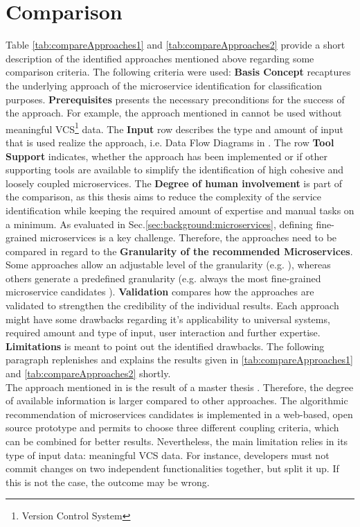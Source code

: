 \section{Comparison} 
\label{sec:stateOfTheArt:comparison}

Table \ref{tab:compareApproaches1} and \ref{tab:compareApproaches2} provide a short description of the identified approaches mentioned above regarding some comparison criteria. The following criteria were used: \textbf{Basis Concept} recaptures the underlying approach of the microservice identification for classification purposes. \textbf{Prerequisites} presents the necessary preconditions for the success of the approach. For example, the approach mentioned in \cite{ExtractionMazlami} cannot be used without meaningful VCS\footnote{Version Control System} data. The \textbf{Input} row describes the type and amount of input that is used realize the approach, i.e. Data Flow Diagrams in \cite{DataflowDrivenChen}. The row \textbf{Tool Support} indicates, whether the approach has been implemented or if other supporting tools are available to simplify the identification of high cohesive and loosely coupled microservices. The \textbf{Degree of human involvement} is part of the comparison, as this thesis aims to reduce the complexity of the service identification while keeping the required amount of expertise and manual tasks on a minimum. As evaluated in Sec.\ref{sec:background:microservices}, defining fine-grained microservices is a key challenge. Therefore, the approaches need to be compared in regard to the \textbf{Granularity of the recommended Microservices}. Some approaches allow an adjustable level of the granularity (e.g. \cite{ExtractionMazlami}), whereas others generate a predefined granularity (e.g. always the most fine-grained microservice candidates \cite{HeuristicsAlwis}). \textbf{Validation} compares how the approaches are validated to strengthen the credibility of the individual results. Each approach might have some drawbacks regarding it's applicability to universal systems, required amount and type of input, user interaction and further expertise. \textbf{Limitations} is meant to point out the identified drawbacks. The following paragraph replenishes and explains the results given in \ref{tab:compareApproaches1} and \ref{tab:compareApproaches2} shortly. \\

The approach mentioned in \cite{ExtractionMazlami} is the result of a master thesis \cite{Mazlami}. Therefore, the degree of available information is larger compared to other approaches. The algorithmic recommendation of microservices candidates is implemented in a web-based, open source prototype and permits to choose three different coupling criteria, which can be combined for better results. Nevertheless, the main limitation relies in its type of input data: meaningful VCS data. For instance, developers must not commit changes on two independent functionalities together, but split it up. If this is not the case, the outcome may be wrong. \\

